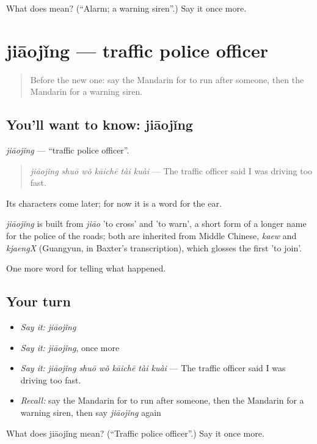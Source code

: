 \begin{tcolorbox}[breakable,colback=teal!4,colframe=teal!35!black,title={Before you move on}]
What does  mean? (\textquotedblleft{}Alarm; a warning siren\textquotedblright{}.) Say it once more.
\end{tcolorbox}
\section[jiāojǐng]{jiāojǐng — traffic police officer}

\label{lesson:ZH-C311-jiaojing}



\begin{quote}
Before the new one: say the Mandarin for to run after someone, then the Mandarin for a warning siren.
\end{quote}

\subsection*{You'll want to know: jiāojǐng}
\emph{jiāojǐng} — \textquotedblleft{}traffic police officer\textquotedblright{}.

\begin{quote}
\emph{jiāojǐng shuō wǒ kāichē tài kuài} — The traffic officer said I was driving too fast.
\end{quote}

Its characters come later; for now it is a word for the ear.

\begin{cousinweb}
\emph{jiāojǐng} is built from \emph{jiāo} 'to cross' and  'to warn', a short form of a longer name for the police of the roads; both are inherited from Middle Chinese, \emph{kaew} and \emph{kjaengX} (Guangyun, in Baxter's transcription), which glosses the first 'to join'.
\end{cousinweb}

\begin{grammarlens}[title={What you've built}]
One more word for telling what happened.
\end{grammarlens}

\subsection*{Your turn}
\begin{itemize}
\raggedright
  \item \emph{Say it:} \emph{jiāojǐng}
  \item \emph{Say it:} \emph{jiāojǐng}, once more
  \item \emph{Say it:} \emph{jiāojǐng shuō wǒ kāichē tài kuài} — The traffic officer said I was driving too fast.
  \item \emph{Recall:} say the Mandarin for to run after someone, then the Mandarin for a warning siren, then say \emph{jiāojǐng} again
\end{itemize}

\begin{tcolorbox}[breakable,colback=teal!4,colframe=teal!35!black,title={Before you move on}]
What does jiāojǐng mean? (\textquotedblleft{}Traffic police officer\textquotedblright{}.) Say it once more.
\end{tcolorbox}
